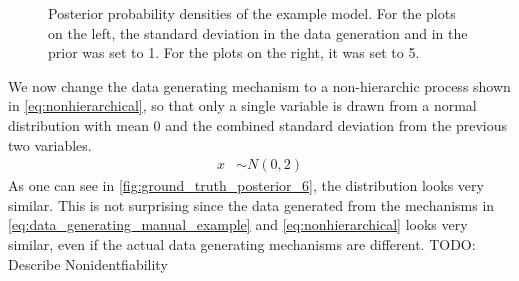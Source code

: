 \documentclass{article}
\begin{document}
\begin{figure}
\begin{minipage}{0.5\linewidth}
	\end{minipage}
\caption[Posterior probability densities of the example model for different standard deviations]{Posterior probability densities of the example model. For the plots on the left, the standard deviation in the data generation and in the prior was set to 1. For the plots on the right, it was set to 5.}
\label{fig:ground_truth_posterior_34}
\end{figure}
\FloatBarrier
\noindent We now change the data generating mechanism to a non-hierarchic process shown in \autoref{eq:nonhierarchical}, so that only a single variable is drawn from a normal distribution with mean 0 and the combined standard deviation from the previous two variables.
\begin{equation}
\label{eq:nonhierarchical}
\begin{split}
x &\sim N(0,2)
\end{split}
\end{equation}
As one can see in \autoref{fig:ground_truth_posterior_6}, the distribution looks very similar. This is not surprising since the data generated from the mechanisms in \autoref{eq:data_generating_manual_example} and \autoref{eq:nonhierarchical} looks very similar, even if the actual data generating mechanisms are different. TODO: Describe Nonidentfiability
\end{document}
